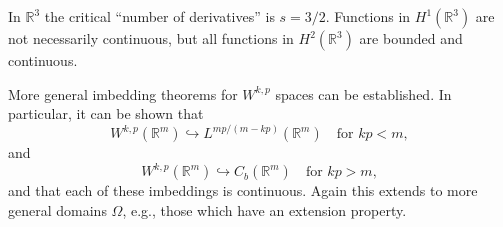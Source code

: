 \begin{Example}
\label{ex:sobolev-three-dimensional-critical-order}
In $\mathbb{R}^3$ the critical ``number of derivatives'' is $s=3/2$. Functions in $H^1(\mathbb{R}^3)$ are not necessarily continuous, but all functions in $H^2(\mathbb{R}^3)$ are bounded and continuous.
\end{Example}

\begin{Remark}
\label{rem:sobolev-general-p-embeddings}
More general imbedding theorems for $W^{k,p}$ spaces can be established. In particular, it can be shown that\[W^{k,p}(\mathbb{R}^m)\hookrightarrow L^{mp/(m-kp)}(\mathbb{R}^m)\quad\text{for }kp<m,\]and\[W^{k,p}(\mathbb{R}^m)\hookrightarrow C_b(\mathbb{R}^m)\quad\text{for }kp>m,\]and that each of these imbeddings is continuous. Again this extends to more general domains $\Omega$, e.g., those which have an extension property.
\end{Remark}
